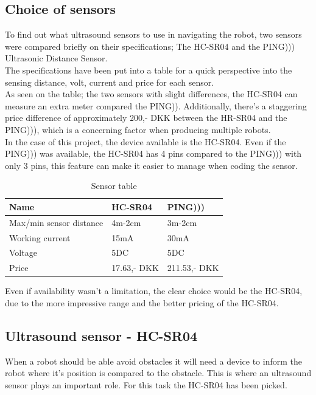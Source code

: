 \subsection{Choice of sensors}
To find out what ultrasound sensors to use in navigating the robot, two sensors were compared briefly on their specifications; The HC-SR04 and the PING))) Ultrasonic Distance Sensor.\\
The specifications have been put into a table for a quick perspective into the sensing distance, volt, current and price for each sensor.\\

As seen on the table; the two sensors with slight differences, the HC-SR04 can measure an extra meter compared the PING)). Additionally, there's a staggering price difference of approximately 200,- DKK between the HR-SR04 and the PING))), which is a concerning factor when producing multiple robots.\\

In the case of this project, the device available is the HC-SR04. Even if the PING))) was available, the HC-SR04 has 4 pins compared to the PING))) with only 3 pins, this feature can make it easier to manage when coding the sensor.\\

\begin{table}[!ht]
\centering

\label{Sensor table}
\begin{tabular}{|l|l|l|}
\hline
\textbf{Name}           & HC-SR04   & PING)))    \\ \hline
Max/min sensor distance & 4m-2cm    & 3m-2cm     \\ \hline
Working current         & 15mA      & 30mA       \\ \hline
Voltage                 & 5DC       & 5DC        \\ \hline
Price                   & 17.63,- DKK & 211.53,- DKK \\ \hline
\end{tabular}
\caption{Sensor table \cite{HC-SR04} \cite{PING}}

\end{table}

Even if availability wasn't a limitation, the clear choice would be the HC-SR04, due to the more impressive range and the better pricing of the HC-SR04.
\newpage
\subsection{Ultrasound sensor - HC-SR04}
When a robot should be able avoid obstacles it will need a device to inform the robot where it's position is compared to the obstacle. This is where an ultrasound sensor plays an important role. For this task the HC-SR04 has been picked.\\

